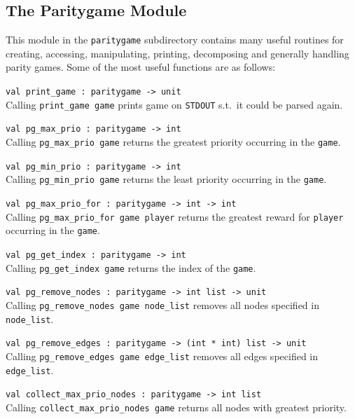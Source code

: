 \subsection{The {\ttfamily Paritygame} Module}

This module in the \texttt{paritygame} subdirectory contains many useful routines for creating, accessing,
manipulating, printing, decomposing and generally handling parity games. Some of the most useful functions
are as follows:

\begin{description}
\itemsep3mm
\item \verb+val print_game : paritygame -> unit+ \ \\
Calling \verb+print_game game+ prints game on \texttt{STDOUT} s.t.\ it could be parsed again.

\item \verb+val pg_max_prio : paritygame -> int+ \ \\
Calling \verb+pg_max_prio game+ returns the greatest priority occurring in the \verb+game+.

\item \verb+val pg_min_prio : paritygame -> int+ \ \\
Calling \verb+pg_min_prio game+ returns the least priority occurring in the \verb+game+.

\item \verb+val pg_max_prio_for : paritygame -> int -> int+ \ \\
Calling \verb+pg_max_prio_for game player+ returns the greatest reward for \verb+player+ occurring in the \verb+game+.

\item \verb+val pg_get_index : paritygame -> int+ \ \\
Calling \verb+pg_get_index game+ returns the index of the \verb+game+.

\item \verb+val pg_remove_nodes : paritygame -> int list -> unit+ \ \\
Calling \verb+pg_remove_nodes game node_list+ removes all nodes specified in \verb+node_list+.

\item \verb+val pg_remove_edges : paritygame -> (int * int) list -> unit+ \ \\
Calling \verb+pg_remove_edges game edge_list+ removes all edges specified in \verb+edge_list+.

\item \verb+val collect_max_prio_nodes : paritygame -> int list+ \ \\
Calling \verb+collect_max_prio_nodes game+ returns all nodes with greatest priority.


\end{description}
